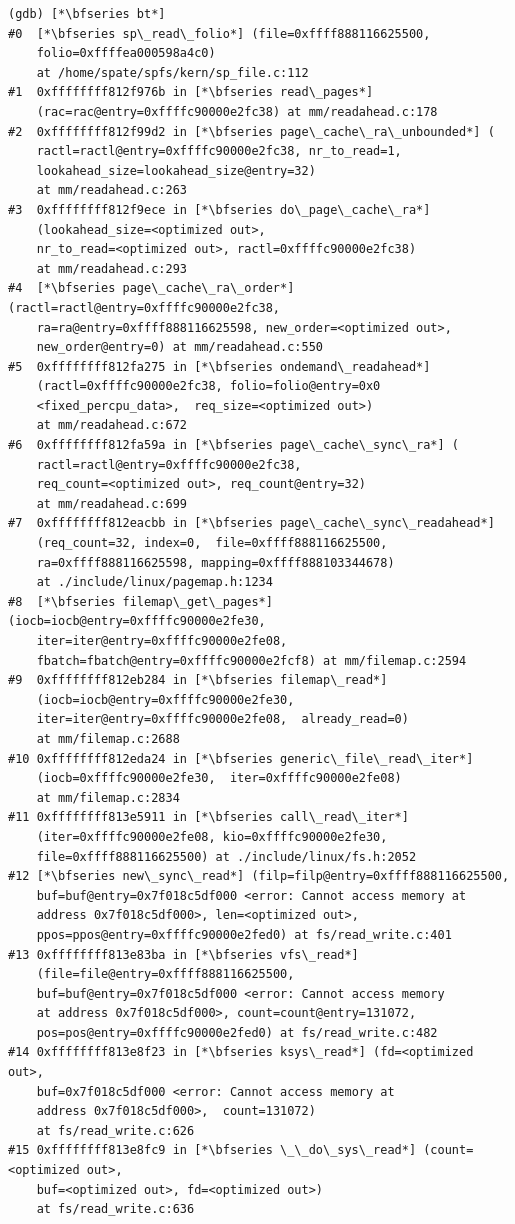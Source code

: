 \begin{lstlisting}
(gdb) [*\bfseries bt*]
#0  [*\bfseries sp\_read\_folio*] (file=0xffff888116625500, 
    folio=0xffffea000598a4c0)
    at /home/spate/spfs/kern/sp_file.c:112
#1  0xffffffff812f976b in [*\bfseries read\_pages*] 
    (rac=rac@entry=0xffffc90000e2fc38) at mm/readahead.c:178
#2  0xffffffff812f99d2 in [*\bfseries page\_cache\_ra\_unbounded*] (
    ractl=ractl@entry=0xffffc90000e2fc38, nr_to_read=1, 
    lookahead_size=lookahead_size@entry=32) 
    at mm/readahead.c:263
#3  0xffffffff812f9ece in [*\bfseries do\_page\_cache\_ra*] 
    (lookahead_size=<optimized out>, 
    nr_to_read=<optimized out>, ractl=0xffffc90000e2fc38) 
    at mm/readahead.c:293
#4  [*\bfseries page\_cache\_ra\_order*] (ractl=ractl@entry=0xffffc90000e2fc38, 
    ra=ra@entry=0xffff888116625598, new_order=<optimized out>, 
    new_order@entry=0) at mm/readahead.c:550
#5  0xffffffff812fa275 in [*\bfseries ondemand\_readahead*] 
    (ractl=0xffffc90000e2fc38, folio=folio@entry=0x0 
    <fixed_percpu_data>,  req_size=<optimized out>)
    at mm/readahead.c:672
#6  0xffffffff812fa59a in [*\bfseries page\_cache\_sync\_ra*] (
    ractl=ractl@entry=0xffffc90000e2fc38, 
    req_count=<optimized out>, req_count@entry=32) 
    at mm/readahead.c:699
#7  0xffffffff812eacbb in [*\bfseries page\_cache\_sync\_readahead*] 
    (req_count=32, index=0,  file=0xffff888116625500, 
    ra=0xffff888116625598, mapping=0xffff888103344678)
    at ./include/linux/pagemap.h:1234
#8  [*\bfseries filemap\_get\_pages*] (iocb=iocb@entry=0xffffc90000e2fe30, 
    iter=iter@entry=0xffffc90000e2fe08, 
    fbatch=fbatch@entry=0xffffc90000e2fcf8) at mm/filemap.c:2594
#9  0xffffffff812eb284 in [*\bfseries filemap\_read*] 
    (iocb=iocb@entry=0xffffc90000e2fe30, 
    iter=iter@entry=0xffffc90000e2fe08,  already_read=0) 
    at mm/filemap.c:2688
#10 0xffffffff812eda24 in [*\bfseries generic\_file\_read\_iter*] 
    (iocb=0xffffc90000e2fe30,  iter=0xffffc90000e2fe08) 
    at mm/filemap.c:2834
#11 0xffffffff813e5911 in [*\bfseries call\_read\_iter*] 
    (iter=0xffffc90000e2fe08, kio=0xffffc90000e2fe30, 
    file=0xffff888116625500) at ./include/linux/fs.h:2052
#12 [*\bfseries new\_sync\_read*] (filp=filp@entry=0xffff888116625500, 
    buf=buf@entry=0x7f018c5df000 <error: Cannot access memory at 
    address 0x7f018c5df000>, len=<optimized out>, 
    ppos=ppos@entry=0xffffc90000e2fed0) at fs/read_write.c:401
#13 0xffffffff813e83ba in [*\bfseries vfs\_read*] 
    (file=file@entry=0xffff888116625500, 
    buf=buf@entry=0x7f018c5df000 <error: Cannot access memory 
    at address 0x7f018c5df000>, count=count@entry=131072, 
    pos=pos@entry=0xffffc90000e2fed0) at fs/read_write.c:482
#14 0xffffffff813e8f23 in [*\bfseries ksys\_read*] (fd=<optimized out>, 
    buf=0x7f018c5df000 <error: Cannot access memory at 
    address 0x7f018c5df000>,  count=131072) 
    at fs/read_write.c:626
#15 0xffffffff813e8fc9 in [*\bfseries \_\_do\_sys\_read*] (count=<optimized out>, 
    buf=<optimized out>, fd=<optimized out>) 
    at fs/read_write.c:636
\end{lstlisting}

